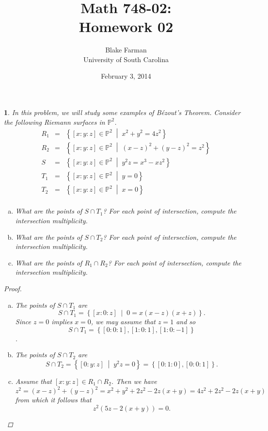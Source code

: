 \documentclass[10pt]{amsart}
\author{Blake Farman\\University of South Carolina}
\title{Math 748-02:\\Homework 02}
\date{February 3, 2014}
\begin{document}
\maketitle

\providecommand{\p}{\mathfrak{p}}
\providecommand{\m}{\mathfrak{m}}
\providecommand{\Deck}[1]{\operatorname{Deck}\left(#1\right)}

\newtheorem{thm}{}
\newtheorem{lem}{Lemma}
\newtheorem{prop}{Proposition}
\theoremstyle{definition}
\newtheorem{defn}{Definition}[thm]

\newcommand{\A}{\mathbb{A}}

\begin{thm}
	In this problem, we will study some examples of B\'{e}zout's Theorem.
	Consider the following Riemann surfaces in $\mathbb{P}^2$.
	\begin{eqnarray*}
		R_1 &=& \left\{ [x : y : z] \in \mathbb{P}^2 \;\middle\vert\; x^2 + y^2 = 4z^2 \right\}\\
		R_2 &=& \left\{ [x : y : z] \in \mathbb{P}^2 \;\middle\vert\; (x - z)^2 + (y - z)^2 = z^2 \right\}\\
		S &=& \left\{ [x : y : z] \in \mathbb{P}^2 \;\middle\vert\; y^2z = x^3 - xz^2\right\}\\
		T_1 &=& \left\{ [x : y : z] \in \mathbb{P}^2 \;\middle\vert\; y = 0 \right\}\\
		T_2 &=& \left\{ [x : y : z] \in \mathbb{P}^2 \;\middle\vert\; x = 0 \right\}\\
	\end{eqnarray*}
	\begin{enumerate}[(a)]
		\item
		What are the points of $S \cap T_1$?
		For each point of intersection, compute the intersection multiplicity.
		\item
		What are the points of $S \cap T_2$?
		For each point of intersection, compute the intersection multiplicity.
		\item
		What are the points of $R_1 \cap R_2$?
		For each point of intersection, compute the intersection multiplicity.
	\end{enumerate}

	\begin{proof}
		\begin{enumerate}[(a)]
			\item
			The points of $S \cap T_1$ are
			$$S \cap T_1 = \left\{ [x : 0 : z] \;\middle\vert\; 0 = x(x - z)(x + z)\right\}.$$
			Since $z = 0$ implies $x = 0$, we may assume that $z = 1$ and so
			$$S \cap T_1 = \left\{ [0 : 0 : 1], [1 : 0 : 1], [1 : 0 : -1] \right\}$$.
			\item
			The points of $S \cap T_2$ are
			$$S \cap T_2 = \left\{ [0 : y : z] \;\middle\vert\; y^2z = 0 \right\} = \left\{[0 : 1 : 0], [0 : 0 : 1]\right\}.$$
			\item
			Assume that $[x : y : z] \in R_1 \cap R_2$.
			Then we have
			$$z^2 = (x - z)^2 + (y - z)^2 = x^2 + y^2 + 2z^2 - 2z(x + y) = 4z^2 + 2z^2 - 2z(x + y)$$
			from which it follows that
			$$z^2(5z - 2(x + y)) = 0.$$
			

\end{enumerate}
\end{proof}
\end{thm}
\end{document}
